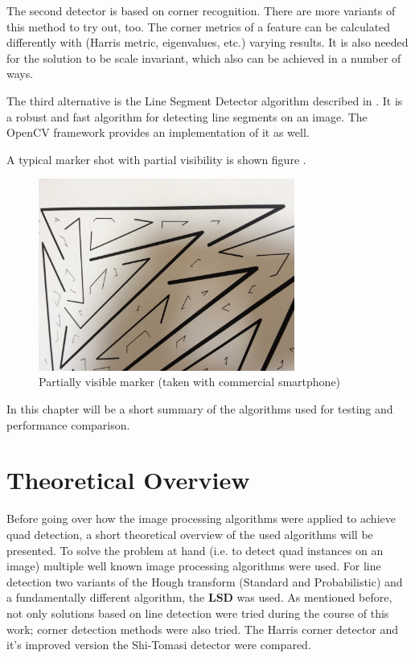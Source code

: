 The second detector is based on corner recognition.
There are more variants of this method to try out, too.
The corner metrics of a feature can be calculated differently with (Harris metric, eigenvalues, etc.) varying results.
It is also needed for the solution to be scale invariant, which also can be achieved in a number of ways.

The third alternative is the Line Segment Detector algorithm described in \cite{LSDDet}.
It is a robust and fast algorithm for detecting line segments on an image.
The OpenCV framework provides an implementation of it as well.

A typical marker shot with partial visibility is shown figure .
\begin{figure}[ht]
	\centering
	\includegraphics[width=0.75\textwidth]{figures/t35_01.JPG}
	\caption{Partially visible marker (taken with commercial smartphone)}
	\label{fig:partialMarkerShot}
\end{figure}
In this chapter will be a short summary of the algorithms used for testing and performance comparison.

\section{Theoretical Overview}

Before going over how the image processing algorithms were applied to achieve quad detection, a short theoretical overview of the used algorithms will be presented.
To solve the problem at hand (i.e. to detect quad instances on an image) multiple well known image processing algorithms were used.
For line detection two variants of the Hough transform (Standard\cite{houghThetaRho} and Probabilistic\cite{MATAS2000119}) and a fundamentally different algorithm, the \textbf{LSD} was used.
As mentioned before, not only solutions based on line detection were tried during the course of this work; corner detection methods were also tried.
The Harris corner detector\cite{Harris88alvey} and it's improved version the Shi-Tomasi detector\cite{Shi94goodfeatures} were compared.

